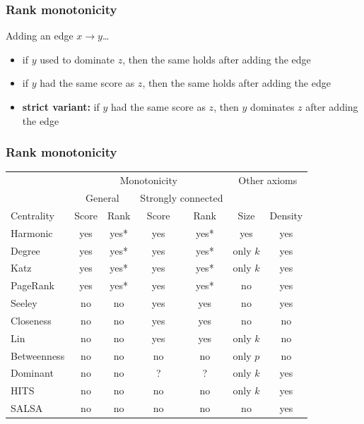 \begin{frame}
  \frametitle{Rank monotonicity}
  Adding an edge $x \to y$\dots
  \begin{itemize}
    \pause\item if $y$ used to dominate $z$, then the same holds after adding
    the edge
    \pause\item if $y$ had the same score as $z$, then the same holds after
    adding the edge
    \pause\item {\bf strict variant: } if $y$ had the same score as $z$, then $y$
    dominates $z$ after adding the edge
\end{itemize}
\end{frame}

\begin{frame}
  \frametitle{Rank monotonicity}
  \begin{table}
    \renewcommand{\arraystretch}{1.2}
    \begin{minipage}{\textwidth}
      \centering
      \begin{tabular}{l|c|c|c|c|c|c}
        \multicolumn{1}{c|}{}&\multicolumn{4}{c|}{Monotonicity}&\multicolumn{2}{c}{Other axioms}\\
        \multicolumn{1}{c|}{}&\multicolumn{2}{c|}{General}&\multicolumn{2}{c|}{Strongly connected}&\multicolumn{2}{c}{}\\
        Centrality & Score & Rank & Score & Rank & Size & Density
        \\
        \hline
        Harmonic & yes  & yes* & yes & yes* & yes & yes \\
        Degree  & yes & yes* & yes & yes* & only $k$ & yes \\
        Katz & yes & yes*& yes & yes* & only $k$ & yes \\
        PageRank &  yes & yes*& yes & yes* & no & yes \\
        Seeley & no & no & yes & yes & no & yes \\
        Closeness & no  & no & yes & yes & no & no \\
        Lin & no & no & yes & yes & only $k$& no \\
        Betweenness & no & no & no & no & only $p$ & no \\
        Dominant & no & no &? &? & only $k$ & yes \\
        HITS & no & no & no &no & only $k$ &yes\\
        SALSA & no & no & no &no & no & yes
      \end{tabular}
    \end{minipage}
  \end{table}
\end{frame}

